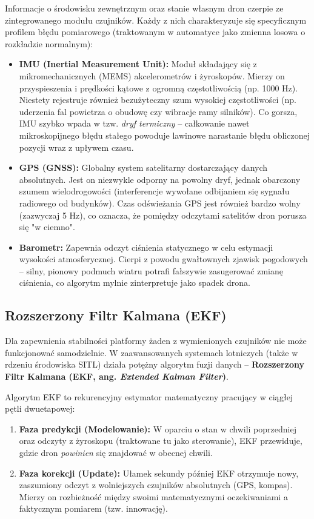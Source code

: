 Informacje o środowisku zewnętrznym oraz stanie własnym dron czerpie ze zintegrowanego modułu czujników. Każdy z nich charakteryzuje się specyficznym profilem błędu pomiarowego (traktowanym w automatyce jako zmienna losowa o rozkładzie normalnym):
\begin{itemize}
    \item \textbf{IMU (Inertial Measurement Unit):} Moduł składający się z mikromechanicznych (MEMS) akcelerometrów i żyroskopów. Mierzy on przyspieszenia i prędkości kątowe z ogromną częstotliwością (np. 1000 Hz). Niestety rejestruje również bezużyteczny szum wysokiej częstotliwości (np. uderzenia fal powietrza o obudowę czy wibracje ramy silników). Co gorsza, IMU szybko wpada w tzw. \textit{dryf termiczny} – całkowanie nawet mikroskopijnego błędu stałego powoduje lawinowe narastanie błędu obliczonej pozycji wraz z upływem czasu.
    \item \textbf{GPS (GNSS):} Globalny system satelitarny dostarczający danych absolutnych. Jest on niezwykle odporny na powolny dryf, jednak obarczony szumem wielodrogowości (interferencje wywołane odbijaniem się sygnału radiowego od budynków). Czas odświeżania GPS jest również bardzo wolny (zazwyczaj 5 Hz), co oznacza, że pomiędzy odczytami satelitów dron porusza się "w ciemno".
    \item \textbf{Barometr:} Zapewnia odczyt ciśnienia statycznego w celu estymacji wysokości atmosferycznej. Cierpi z powodu gwałtownych zjawisk pogodowych – silny, pionowy podmuch wiatru potrafi fałszywie zasugerować zmianę ciśnienia, co algorytm mylnie zinterpretuje jako spadek drona.
\end{itemize}

\subsection{Rozszerzony Filtr Kalmana (EKF)}

Dla zapewnienia stabilności platformy żaden z wymienionych czujników nie może funkcjonować samodzielnie. W zaawansowanych systemach lotniczych (także w rdzeniu środowiska SITL) działa potężny algorytm fuzji danych – \textbf{Rozszerzony Filtr Kalmana (EKF, ang. \textit{Extended Kalman Filter})}.

Algorytm EKF to rekurencyjny estymator matematyczny pracujący w ciągłej pętli dwuetapowej:
\begin{enumerate}
    \item \textbf{Faza predykcji (Modelowanie):} W oparciu o stan w chwili poprzedniej oraz odczyty z żyroskopu (traktowane tu jako sterowanie), EKF przewiduje, gdzie dron \textit{powinien} się znajdować w obecnej chwili.
    \item \textbf{Faza korekcji (Update):} Ułamek sekundy później EKF otrzymuje nowy, zaszumiony odczyt z wolniejszych czujników absolutnych (GPS, kompas). Mierzy on rozbieżność między swoimi matematycznymi oczekiwaniami a faktycznym pomiarem (tzw. innowację). 
\end{enumerate}

